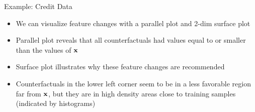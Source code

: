 \documentclass[10pt,compress,t,notes=noshow, xcolor=table]{beamer}
\begin{document}
\begin{frame}{Example: Credit Data }
\begin{itemize}
	\item<1-> We can visualize feature changes with a parallel plot and 2-dim surface plot
		\item<1-> Parallel plot reveals that all counterfactuals had values equal to or smaller than the values of $\mathbf{x}$
		\item<2-> Surface plot illustrates why these feature changes are recommended 
		\item<2-> Counterfactuals in the lower left corner seem to be in a less favorable region far from $\mathbf{x}$, but they are in high density areas close to training samples (indicated by histograms)
	\end{itemize}
	\begin{columns}
	\end{columns}
\end{frame}
\end{document}
